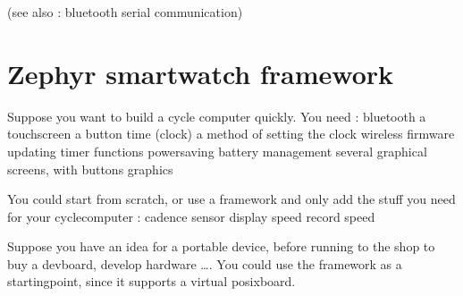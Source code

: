 \documentclass[letterpaper,10pt,english]{sphinxmanual}
\begin{document}
(see also : bluetooth serial communication)


\chapter{Zephyr  smartwatch framework}
\label{\detokenize{content:zephyr-smartwatch-framework}}\label{\detokenize{content::doc}}
Suppose you want to build a cycle computer quickly.
You need :
\sphinxhyphen{} bluetooth
\sphinxhyphen{} a touchscreen
\sphinxhyphen{} a button
\sphinxhyphen{} time (clock)
\sphinxhyphen{} a method of setting the clock
\sphinxhyphen{} wireless firmware updating
\sphinxhyphen{} timer functions
\sphinxhyphen{} powersaving
\sphinxhyphen{} battery management
\sphinxhyphen{} several graphical screens, with buttons graphics

You could start from scratch, or use a framework and only add the stuff you need for your cyclecomputer :
\sphinxhyphen{} cadence sensor
\sphinxhyphen{} display speed
\sphinxhyphen{} record speed

Suppose you have an idea for a portable device, before running to the shop to buy a dev\sphinxhyphen{}board, develop hardware ….
You could use the framework as a startingpoint, since it supports a virtual posix\sphinxhyphen{}board.
\end{document}
